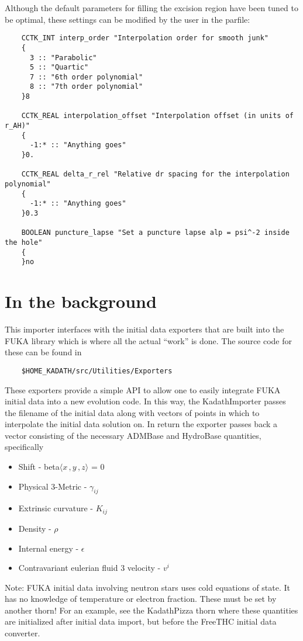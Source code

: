 Although the default parameters for filling the excision region have been tuned to be
optimal, these settings can be modified by the user in the parfile:
\begin{verbatim}
    CCTK_INT interp_order "Interpolation order for smooth junk"
    {
      3 :: "Parabolic"
      5 :: "Quartic"
      7 :: "6th order polynomial"
      8 :: "7th order polynomial"
    }8
    
    CCTK_REAL interpolation_offset "Interpolation offset (in units of r_AH)"
    {
      -1:* :: "Anything goes"
    }0.
    
    CCTK_REAL delta_r_rel "Relative dr spacing for the interpolation polynomial"
    {
      -1:* :: "Anything goes"
    }0.3
    
    BOOLEAN puncture_lapse "Set a puncture lapse alp = psi^-2 inside the hole"
    {
    }no
\end{verbatim}

\section{In the background}
This importer interfaces with the initial data exporters that are built into the
FUKA library which is where all the actual ``work'' is done.  
The source code for these can be found in
%
\begin{verbatim}
    $HOME_KADATH/src/Utilities/Exporters
\end{verbatim}
%
These exporters provide a simple API to allow one to easily integrate FUKA
initial data into a new evolution code.  In this way, the KadathImporter passes
the filename of the initial data along with vectors of points in which to interpolate
the initial data solution on.  In return the exporter passes back a vector consisting
of the necessary ADMBase and HydroBase quantities, specifically
\begin{itemize}
    \item Shift - beta$\langle x\,, y\,, z \rangle$ = 0
    \item Physical 3-Metric - $\gamma_{ij}$
    \item Extrinsic curvature - $K_{ij}$
    \item Density - $\rho$
    \item Internal energy - $\epsilon$
    \item Contravariant eulerian fluid 3 velocity - $v^i$
\end{itemize}

Note: FUKA initial data involving neutron stars uses cold equations of state.  It has no knowledge of
temperature or electron fraction.  These must be set by another thorn!  For an example, see the KadathPizza thorn\cite{fukaws} where
these quantities are initialized after initial data import, but before the FreeTHC initial data converter.

